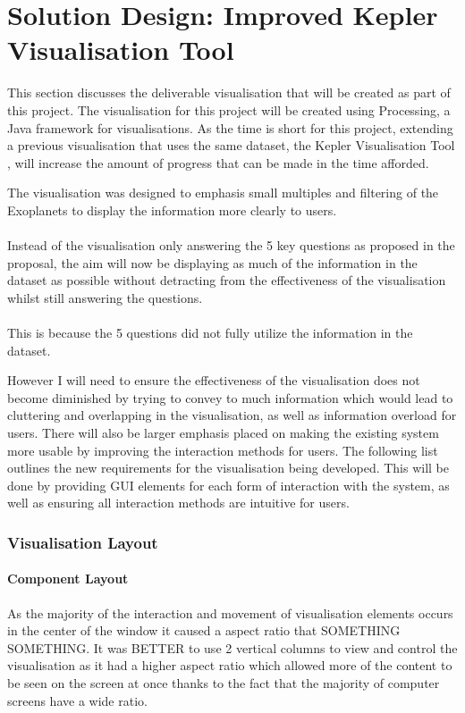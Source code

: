 \chapter{Solution Design: Improved Kepler Visualisation Tool}\label{C:sd}

This section discusses the deliverable visualisation that will be created as part of this project.
The visualisation for this project will be created using Processing, a Java framework for visualisations. As the time is short for this project, extending a previous visualisation that uses the same dataset, the Kepler Visualisation Tool \cite{kepler_github, kepler_article}, will increase the amount of progress that can be made in the time afforded.

The visualisation was designed to emphasis small multiples and filtering of the Exoplanets to display the information more clearly to users. 
\\\\
Instead of the visualisation only answering the 5 key questions as proposed in the proposal, the aim will now be displaying as much of the information in the dataset as possible without detracting from the effectiveness of the visualisation whilst still answering the questions. 
\\\\
This is because the 5 questions did not fully utilize the information in the dataset. 

However I will need to ensure the effectiveness of the visualisation does not become diminished by trying to convey to much information which would lead to cluttering and overlapping in the visualisation, as well as information overload for users. There will also be larger emphasis placed on making the existing system more usable by improving the interaction methods for users. The following list outlines the new requirements for the visualisation being developed. This will be done by 
providing GUI elements for each form of interaction with the system, as well as ensuring all interaction methods are intuitive for users. 
\subsection{Visualisation Layout}
\subsubsection{Component Layout}
As the majority of the interaction and movement of visualisation elements occurs in the center of the window it caused a aspect ratio that SOMETHING SOMETHING. It was BETTER to use 2 vertical columns to view and control the visualisation as it had a higher aspect ratio which allowed more of the content to be seen on the screen at once thanks to the fact that the majority of computer screens have a wide ratio.

